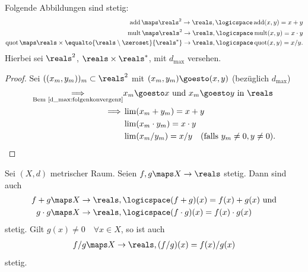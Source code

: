 \begin{lemma}\label{d_max:operationen_stetig}
    Folgende Abbildungen sind stetig:
    \begin{align*}
        \operatorname{add}\maps \reals^2\to \reals,\logicspace \operatorname{add}(x,y)=x+y\\
        \operatorname{mult}\maps \reals^2\to \reals,\logicspace \operatorname{mult}(x,y)=x\cdot y\\
        \operatorname{quot}\maps \reals \times\equalto{\reals \setminus\zeroset}{\reals^{*}}\to \reals,\logicspace \operatorname{quot}(x,y)=x/y.
    \end{align*}
    Hierbei sei \( \reals^2\), \( \reals \times\reals^{*}\), mit \( d_{\max}\) versehen.
\end{lemma}
\begin{proof}
    Sei \( ((x_m,y_m))_m\subset \reals^2\) mit \( (x_m,y_m)\goesto (x,y)\) (bezüglich \( d_{\max}\))
    \begin{align*}
        \underset{\text{Bem~\ref{d_max:folgenkonvergenz}}}{\implies} &x_m\goesto x\text{ und }x_m\goesto y\text{ in }\reals \\
        \implies& \lim (x_m+y_m)=x+y\\
        &\lim (x_m\cdot y_m)=x\cdot y\\
        &\lim (x_m/y_m)=x/y\quad (\text{falls }y_m \neq 0,y\neq 0).
    \end{align*}
    
\end{proof}
\begin{folgerung*}
    Sei \( (X,d)\) metrischer Raum. Seien \( f,g\maps X\to \reals \) stetig. Dann sind auch
    \begin{align*}
        f+g&\maps X\to \reals,\logicspace  (f+g)(x)=f(x)+g(x) \text{ und}\\
        g\cdot g&\maps X\to \reals,\logicspace (f\cdot g)(x)=f(x)\cdot g(x)
    \end{align*}
    stetig. Gilt \( g(x)\neq 0 \quad \forall x\in X\), so ist auch
    \begin{align*}
        f/g\maps X\to \reals, (f/g)(x)=f(x)/g(x)
    \end{align*}
    stetig.
\end{folgerung*}
